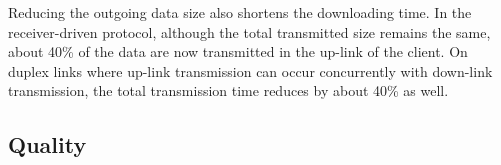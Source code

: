 Reducing the outgoing data size also shortens the downloading time.
In the receiver-driven protocol, although the total transmitted size remains
the same, about 40\% of the data are now transmitted in the up-link of
the client.  On duplex links where up-link transmission can occur concurrently with down-link
transmission, the total transmission time reduces by about 40\% as well.
\subsection{Quality}

